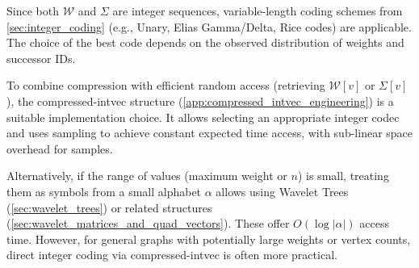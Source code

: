 

Since both $\mathcal{W}$ and $\Sigma$ are integer sequences, variable-length coding schemes from \autoref{sec:integer_coding} (e.g., Unary, Elias Gamma/Delta, Rice codes) are applicable. The choice of the best code depends on the observed distribution of weights and successor IDs.

To combine compression with efficient random access (retrieving $\mathcal{W}[v]$ or $\Sigma[v]$), the \textsf{compressed-intvec} structure (\autoref{app:compressed_intvec_engineering}) is a suitable implementation choice. It allows selecting an appropriate integer codec and uses sampling to achieve constant expected time access, with sub-linear space overhead for samples.

Alternatively, if the range of values (maximum weight or $n$) is small, treating them as symbols from a small alphabet $\alpha$ allows using Wavelet Trees (\autoref{sec:wavelet_trees}) or related structures (\autoref{sec:wavelet_matrices_and_quad_vectors}). These offer $O(\log |\alpha|)$ access time. However, for general graphs with potentially large weights or vertex counts, direct integer coding via \textsf{compressed-intvec} is often more practical.

